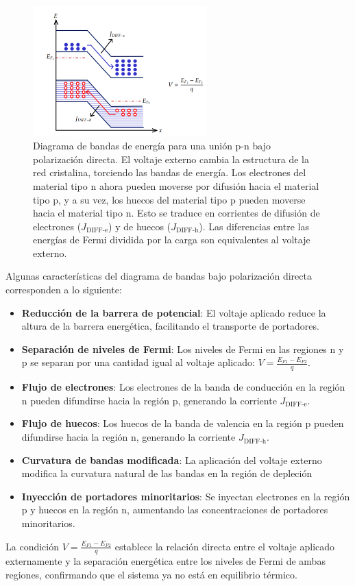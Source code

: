 \documentclass[
  11pt,
  letterpaper,
   addpoints,
   answers
  ]{exam}
\begin{document}
\begin{questions}
\begin{solution}
    \begin{figure}[H]
        \centering
        \includegraphics[width=0.6\textwidth]{../figures/Auxiliar_2_12}
        \caption{Diagrama de bandas de energía para una unión p-n bajo polarización directa. El voltaje externo cambia la estructura de la red cristalina, torciendo las bandas de energía. Los electrones del material tipo n ahora pueden moverse por difusión hacia el material tipo p, y a su vez, los huecos del material tipo p pueden moverse hacia el material tipo n. Esto se traduce en corrientes de difusión de electrones ($J_{\text{DIFF-e}}$) y de huecos ($J_{\text{DIFF-h}}$). Las diferencias entre las energías de Fermi dividida por la carga son equivalentes al voltaje externo.}
        \label{fig:bandas_polarizacion}
    \end{figure}

Algunas características del diagrama de bandas bajo polarización directa corresponden a lo siguiente:
    \begin{itemize}
        \item \textbf{Reducción de la barrera de potencial}: El voltaje aplicado reduce la altura de la barrera energética, facilitando el transporte de portadores.
        \item \textbf{Separación de niveles de Fermi}: Los niveles de Fermi en las regiones n y p se separan por una cantidad igual al voltaje aplicado: $V = \frac{E_{F1} - E_{F2}}{q}$.
        \item \textbf{Flujo de electrones}: Los electrones de la banda de conducción en la región n pueden difundirse hacia la región p, generando la corriente $J_{\text{DIFF-e}}$.
        \item \textbf{Flujo de huecos}: Los huecos de la banda de valencia en la región p pueden difundirse hacia la región n, generando la corriente $J_{\text{DIFF-h}}$.
        \item \textbf{Curvatura de bandas modificada}: La aplicación del voltaje externo modifica la curvatura natural de las bandas en la región de depleción
        \item \textbf{Inyección de portadores minoritarios}: Se inyectan electrones en la región p y huecos en la región n, aumentando las concentraciones de portadores minoritarios.
    \end{itemize}
    La condición $V = \frac{E_{F1} - E_{F2}}{q}$ establece la relación directa entre el voltaje aplicado externamente y la separación energética entre los niveles de Fermi de ambas regiones, confirmando que el sistema ya no está en equilibrio térmico.


\end{solution}
\end{questions}
\end{document}
